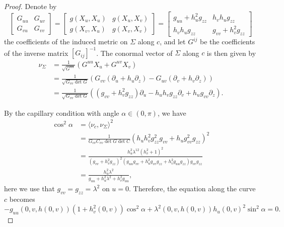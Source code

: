 \documentclass[11pt,reqno]{amsart}
\begin{document}
\begin{proof}
Denote by
\begin{equation*}
    \begin{bmatrix}G_{uu} & G_{uv} \\ G_{vu} & G_{vv} \end{bmatrix}=\begin{bmatrix}g(X_u,X_u) & g(X_u,X_v) \\ g(X_v,X_u) & g(X_v,X_v) \end{bmatrix} = \begin{bmatrix}g_{uu}+h_u^2g_{zz} & h_vh_{u}g_{zz} \\ h_vh_{u}g_{zz} & g_{vv}+h_v^2g_{zz} \end{bmatrix}
\end{equation*}
the coefficients of the induced metric on $\Sigma$ along $c$, and let $G^{ij}$ be the coefficients of the inverse matrix $[G_{ij}]^{-1}$. The conormal vector of $\Sigma$ along $c$ is then given by
\begin{align*}
    \nu_\Sigma & = \frac{1}{\sqrt{G^{uu}}}(G^{uu}X_u+G^{uv}X_v) \\
     & = \frac{1}{\sqrt{G_{vv}\det G}}(G_{vv}(\partial_u+h_u\partial_z)-G_{uv}(\partial_v+h_v\partial_z)) \\
     & = \frac{1}{\sqrt{G_{vv}\det G}}((g_{vv}+h_v^2g_{zz})\partial_u-h_uh_vg_{zz}\partial_v+h_ug_{vv}\partial_z).
\end{align*}

By the capillary condition with angle $\alpha\in (0,\pi)$, we have
\begin{align*}
    \cos^2\alpha  & = \langle \nu_c,\nu_\Sigma\rangle^2 \\ & = \frac{1}{G_{vv}C_{vv}\det G\det C}(h_uh_v^2g_{zz}^2g_{vv}+h_ug_{vv}^2g_{zz})^2 \\
    & = \frac{h_u^2\lambda^{12}(h_v^2+1)^2}{(g_{vv}+h_v^2g_{zz})^2(g_{uu}g_{vv}+h_u^2g_{vv}g_{zz}+h_v^2g_{uu}g_{zz})g_{vv}g_{zz}} \\
    & = \frac{h_u^2\lambda^2}{g_{uu}+h_u^2\lambda^2+h_v^2g_{uu}},  %
\end{align*}
here we use that $g_{vv}=g_{zz}=\lambda^2$ on $u=0$. Therefore, the equation along the curve $c$ becomes
\begin{equation*}
    -g_{uu}(0,v,h(0,v))(1+h_v^2(0,v))\cos^2\alpha+\lambda^2(0,v,h(0,v)) h_u(0,v)^2\sin^2\alpha=0.
\end{equation*}
\end{proof}
\end{document}
